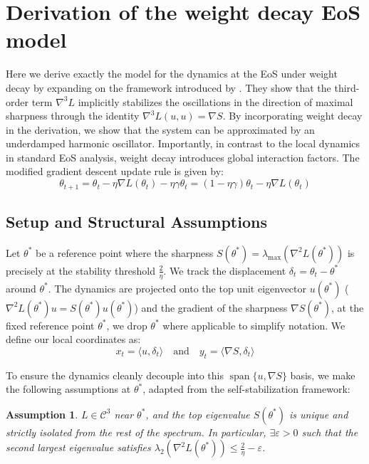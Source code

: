 \documentclass{article}
\newtheorem{assumption}{Assumption}
\begin{document}
\newpage

\section{Derivation of the weight decay EoS model}
\label{app:model}

Here we derive exactly the model for the dynamics at the EoS under weight decay by expanding on the framework introduced by \citep{damian_selfstab}. They show that the third-order term $\nabla^3L$ implicitly stabilizes the oscillations in the direction of maximal sharpness through the identity $\nabla^3L(u,u)=\nabla S$. By incorporating weight decay in the derivation, we show that the system can be approximated by an underdamped harmonic oscillator. Importantly, in contrast to the local dynamics in standard EoS analysis, weight decay introduces global interaction factors. The modified gradient descent update rule is given by:
\begin{equation}
\theta_{t+1} = \theta_t - \eta \nabla L(\theta_t) - \eta \gamma \theta_t = (1 - \eta\gamma)\theta_t - \eta \nabla L(\theta_t)
\end{equation}

\subsection{Setup and Structural Assumptions}
\label{app:model_assumptions}

Let $\theta^*$ be a reference point where the sharpness $S(\theta^*) = \lambda_{\max}(\nabla^2 L(\theta^*))$ is precisely at the stability threshold $\frac{2}{\eta}$.  We track the displacement $\delta_t = \theta_t - \theta^*$ around $\theta^*$. The dynamics are projected onto the top unit eigenvector $u(\theta^*)$ ($\nabla^2 L(\theta^*)u=S(\theta^*)u(\theta^*)$) and the gradient of the sharpness $\nabla S(\theta^*)$, at the fixed reference point $\theta^*$, we drop $\theta^*$ where applicable to simplify notation. We define our local coordinates as:
\begin{equation}
x_t = \langle u, \delta_t \rangle \quad \text{and} \quad y_t = \langle \nabla S, \delta_t \rangle
\end{equation}

To ensure the dynamics cleanly decouple into this $\operatorname{span}\{u, \nabla S\}$ basis, we make the following assumptions at $\theta^*$, adapted from the self-stabilization framework:

\begin{assumption}
$L \in \mathcal{C}^3$ near $\theta^*$, and the top eigenvalue $S(\theta^*)$ is unique and strictly isolated from the rest of the spectrum. In particular, $\exists\varepsilon>0$ such that the second largest eigenvalue satisfies $\lambda_2(\nabla^2 L(\theta^*)) \le \frac{2}{\eta}-\varepsilon$.
\end{assumption}
\end{document}
